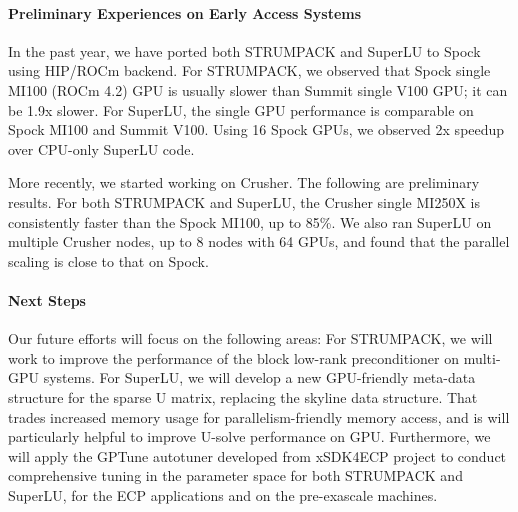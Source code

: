 \paragraph{Preliminary Experiences on Early Access Systems}
In the past year, we have ported both STRUMPACK and SuperLU to Spock using
HIP/ROCm backend. For STRUMPACK, we observed that Spock single MI100 (ROCm 4.2) GPU
is usually slower than Summit single V100 GPU; it can be 1.9x slower. For SuperLU,
the single GPU performance is comparable on Spock MI100 and Summit V100.
Using 16 Spock GPUs, we observed 2x speedup over CPU-only SuperLU code.

More recently, we started working on Crusher. The following are preliminary
results. For both STRUMPACK and SuperLU, the Crusher single MI250X is consistently
faster than the Spock MI100, up to 85\%.
We also ran SuperLU on multiple Crusher nodes, up to 8 nodes with 64 GPUs, and
found that the parallel scaling is close to that on Spock.

\vspace{-.135in}
\paragraph{Next Steps} Our future efforts will focus on the following areas:
 For STRUMPACK, we will work to improve the performance of the block
 low-rank preconditioner on multi-GPU systems.
 For SuperLU, we will develop a new GPU-friendly meta-data structure for the sparse U matrix,
 replacing the skyline data structure. That trades increased memory usage for
 parallelism-friendly memory access, and is will particularly helpful to improve
 U-solve performance on GPU.
 Furthermore, we will apply the GPTune autotuner developed from xSDK4ECP project to conduct comprehensive
 tuning in the parameter space for both STRUMPACK and SuperLU, for the ECP applications and
 on the pre-exascale machines.



